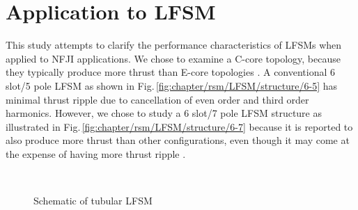     \section{Application to \ac{LFSM}}               \label{Chapter:RSM/LFSM}
    
    
        This study attempts to clarify the performance characteristics of \acsp{LFSM} when applied to \acs{NFJI} applications. We chose to examine a C-core topology, because they typically produce more thrust than E-core topologies \cite{Min2011OptimizationMachines}. A conventional 6 slot/5 pole \acs{LFSM} as shown in Fig.\,\ref{fig:chapter/rsm/LFSM/structure/6-5} has minimal thrust ripple due to cancellation of even order and third order harmonics. However, we chose to study a 6 slot/7 pole LFSM structure as illustrated  in Fig.\,\ref{fig:chapter/rsm/LFSM/structure/6-7} because it is reported to also produce more thrust than other configurations, even though it may come at the expense of having more thrust ripple \cite{Chen2010}. 
        
        
        \begin{figure}[!ht]
            \centering
            \\
            \caption{Schematic of tubular \acs{LFSM}
                \label{fig:conventional_flux_switching_machines}
            }\label{fig:chapter/rsm/LFSM/structure}
        \end{figure}
        
